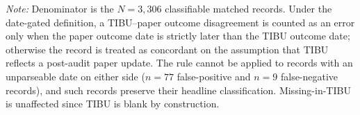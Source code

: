 \newsavebox{\SensBox}
\begin{minipage}{\wd\SensBox}
\usebox{\SensBox}
\par\vspace{4pt}\noindent
\scriptsize{\textit{Note:} Denominator is the $N = 3,306$ classifiable matched records. Under the date-gated definition, a TIBU--paper outcome disagreement is counted as an error only when the paper outcome date is strictly later than the TIBU outcome date; otherwise the record is treated as concordant on the assumption that TIBU reflects a post-audit paper update. The rule cannot be applied to records with an unparseable date on either side ($n = 77$ false-positive and $n = 9$ false-negative records), and such records preserve their headline classification. Missing-in-TIBU is unaffected since TIBU is blank by construction.}
\end{minipage}